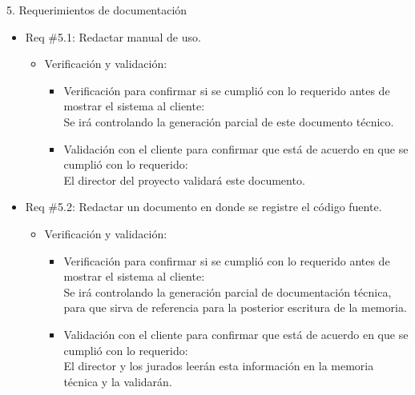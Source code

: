 \documentclass[11pt]{charter}
\begin{document}
5. Requerimientos de documentación

\begin{itemize}
\item Req \#5.1: Redactar manual de uso. 
\begin{itemize}
\item Verificación y validación:
	\begin{itemize}
	\item Verificación para confirmar si se cumplió con lo requerido 	antes de mostrar el sistema al cliente:\\
	Se irá controlando la generación parcial de este documento
	técnico.
	\item Validación con el cliente para confirmar que está de 				acuerdo en que se cumplió con lo requerido:\\
	El director del proyecto validará este documento.  
	\end{itemize}
\end{itemize}
\end{itemize}

\begin{itemize}
\item Req \#5.2: Redactar un documento en donde se registre el código fuente. 
\begin{itemize}
\item Verificación y validación:
	\begin{itemize}
	\item Verificación para confirmar si se cumplió con lo requerido 	antes de mostrar el sistema al cliente:\\
	Se irá controlando la generación parcial de documentación
	técnica, para que sirva de referencia para la posterior
	escritura de la memoria.
	\item Validación con el cliente para confirmar que está de 				acuerdo en que se cumplió con lo requerido:\\
	El director y los jurados leerán esta información en la memoria
	técnica y la validarán.
	\end{itemize}
\end{itemize}
\end{itemize}
\end{document}
